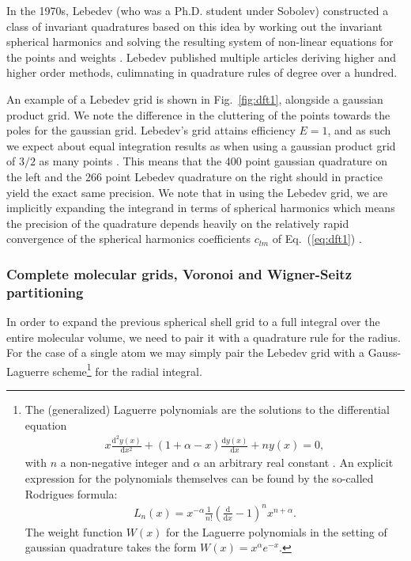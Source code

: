 \documentclass[a4paper]{article}
\newcommand{\der} [2]{\frac{\mathrm{d} #1}{\mathrm{d} #2}}   %
\newcommand{\fig}[1]{Fig.\ \ref{fig:#1}}
\newcommand{\eq} [1]{Eq.\ (\ref{eq:#1})}
\newcommand{\comment}[1]{\ignorespaces}
\begin{document}
In the 1970s, Lebedev (who was a Ph.D. student under Sobolev) constructed a class of invariant quadratures based on this idea by working out the invariant spherical harmonics and solving the resulting system of non-linear equations for the points and weights \cite{lebedev}\cite{beentjes}\comment{p4}. Lebedev published multiple articles deriving higher and higher order methods, culimnating in quadrature rules of degree over a hundred. 

An example of a Lebedev grid is shown in \fig{dft1}, alongside a gaussian product grid. We note the difference in the cluttering of the points towards the poles for the gaussian grid. Lebedev's grid attains efficiency $E=1$, and as such we expect about equal integration results as when using a gaussian product grid of $3/2$ as many points \cite{beentjes}\comment{p5}. This means that the $400$ point gaussian quadrature on the left and the 266 point Lebedev quadrature on the right should in practice yield the exact same precision. We note that in using the Lebedev grid, we are implicitly expanding the integrand in terms of spherical harmonics which means the precision of the quadrature depends heavily on the relatively rapid convergence of the spherical harmonics coefficients $c_{lm}$ of \eq{dft1} \cite{voronoi1}.

\subsubsection{Complete molecular grids, Voronoi and Wigner-Seitz partitioning}
In order to expand the previous spherical shell grid to a full integral over the entire molecular volume, we need to pair it with a quadrature rule for the radius. For the case of a single atom we may simply pair the Lebedev grid with a Gauss-Laguerre scheme\footnote{The (generalized) Laguerre polynomials are the solutions to the differential equation
\begin{align}
x\der{^2y(x)}{x^2}+\left(1+\alpha-x\right)\der{y(x)}{x}+ny(x)=0,
\end{align}
with $n$ a non-negative integer and $\alpha$ an arbitrary real constant \cite{rottmann}. An explicit expression for the polynomials themselves can be found by the so-called Rodrigues formula:
\begin{align}
L_n(x) = x^{-\alpha}\frac{1}{n!}\left(\der{}{x}-1\right)^nx^{n+\alpha}.
\end{align}
The weight function $W(x)$ for the Laguerre polynomials in the setting of gaussian quadrature takes the form $W(x)=x^\alpha e^{-x}$.} for the radial integral.  
\end{document}
